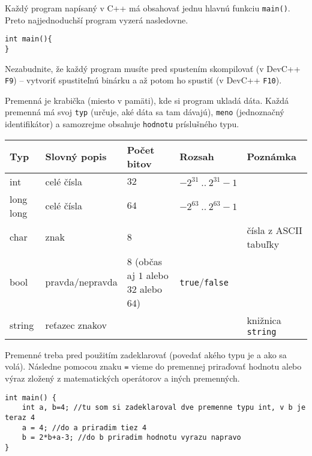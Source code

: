 




Každý program napísaný v C++ má obsahovať jednu hlavnú funkciu \texttt{main()}. Preto najjednoduchší
program vyzerá nasledovne.

\begin{lstlisting}
int main(){
}
\end{lstlisting}

Nezabudnite, že každý program musíte pred spustením skompilovať (v DevC++ \texttt{F9}) -- vytvoriť
spustiteľnú binárku a až potom ho spustiť (v DevC++ \texttt{F10}).


Premenná je krabička (miesto v pamäti), kde si program ukladá dáta. Každá premenná má svoj
\texttt{typ} (určuje, aké dáta sa tam dávajú), \texttt{meno} (jednoznačný identifikátor) a
samozrejme obsahuje \texttt{hodnotu} príslušného typu.

\begin{tabular}{| l | l | l | l | l |}
\hline
Typ&Slovný popis&Počet bitov&Rozsah&Poznámka\\ \hline
int&celé čísla&$32$&$-2^{31}\ ..\ 2^{31}-1$&\\ \hline
long long&celé čísla&$64$&$-2^{63}\ ..\ 2^{63}-1$&\\ \hline
char&znak&8&&čísla z ASCII tabuľky\\ \hline
bool&pravda/nepravda&$8$ (občas aj $1$ alebo $32$ alebo $64$)&\texttt{true}/\texttt{false}&\\\hline
string&reťazec znakov&&&knižnica \texttt{string}\\ \hline
\end{tabular}

Premenné treba pred použitím zadeklarovať (povedať akého typu je a ako sa volá). Následne pomocou
znaku \texttt{=} vieme do premennej priraďovať hodnotu alebo výraz zložený z matematických
operátorov a iných premenných.

\begin{lstlisting}
int main() {
    int a, b=4; //tu som si zadeklaroval dve premenne typu int, v b je teraz 4
    a = 4; //do a priradim tiez 4
    b = 2*b+a-3; //do b priradim hodnotu vyrazu napravo
}
\end{lstlisting}

